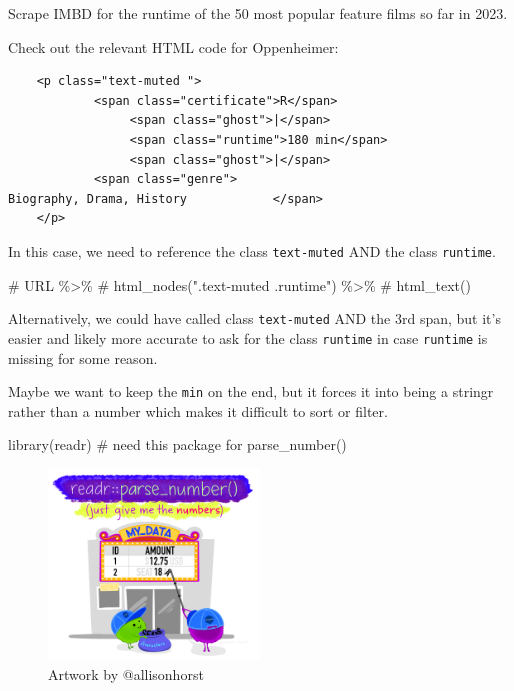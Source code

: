 \documentclass[
  letterpaper,
  DIV=11,
  numbers=noendperiod]{scrartcl}
\newenvironment{Shaded}{\begin{snugshade}}{\end{snugshade}}
\newcommand{\CommentTok}[1]{\textcolor[rgb]{0.37,0.37,0.37}{#1}}
\newcommand{\FunctionTok}[1]{\textcolor[rgb]{0.28,0.35,0.67}{#1}}
\newcommand{\NormalTok}[1]{\textcolor[rgb]{0.00,0.23,0.31}{#1}}
\begin{document}
Scrape IMBD for the runtime of the 50 most popular feature films so far
in 2023.

Check out the relevant HTML code for Oppenheimer:

\begin{verbatim}
    <p class="text-muted ">
            <span class="certificate">R</span>
                 <span class="ghost">|</span> 
                 <span class="runtime">180 min</span>
                 <span class="ghost">|</span> 
            <span class="genre">
Biography, Drama, History            </span>
    </p>
\end{verbatim}

In this case, we need to reference the class \texttt{text-muted} AND the
class \texttt{runtime}.

\begin{Shaded}
\begin{Highlighting}[]
\CommentTok{\# URL \%\textgreater{}\%}
\CommentTok{\#   html\_nodes(".text{-}muted .runtime") \%\textgreater{}\%}
\CommentTok{\#   html\_text() }
\end{Highlighting}
\end{Shaded}

Alternatively, we could have called class \texttt{text-muted} AND the
3rd span, but it's easier and likely more accurate to ask for the class
\texttt{runtime} in case \texttt{runtime} is missing for some reason.

Maybe we want to keep the \texttt{min} on the end, but it forces it into
being a stringr rather than a number which makes it difficult to sort or
filter.

\begin{Shaded}
\begin{Highlighting}[]
\FunctionTok{library}\NormalTok{(readr)}
\CommentTok{\# need this package for parse\_number()}
\end{Highlighting}
\end{Shaded}

\begin{figure}

{\centering \includegraphics[width=0.5\textwidth,height=\textheight]{118_P_webscraping_text_files/mediabag/4fd04f07-7404-4371-8.png}

}

\caption{Artwork by @allisonhorst}

\end{figure}
\end{document}
